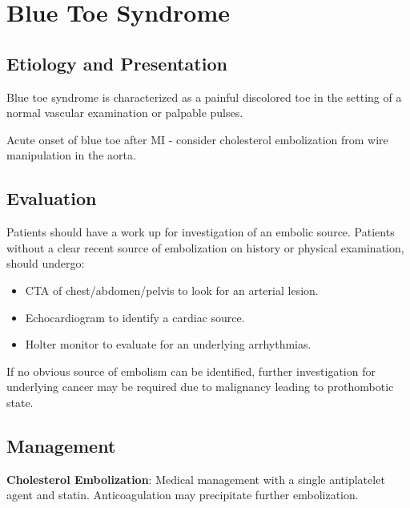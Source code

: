 \documentclass[
]{book}
\begin{document}
\hypertarget{blue-toe-syndrome}{%
\section{Blue Toe Syndrome}\label{blue-toe-syndrome}}

\hypertarget{etiology-and-presentation-1}{%
\subsection{Etiology and Presentation}\label{etiology-and-presentation-1}}

Blue toe syndrome is characterized as a painful discolored toe in the
setting of a normal vascular examination or palpable pulses.

Acute onset of blue toe after MI - consider cholesterol embolization
from wire manipulation in the aorta.
\citep{saricAorticAtherosclerosisEmbolic2012}

\hypertarget{evaluation-13}{%
\subsection{Evaluation}\label{evaluation-13}}

Patients should have a work up for investigation of an embolic source.
Patients without a clear recent source of embolization on history or
physical examination, should undergo:

\begin{itemize}
\item
  CTA of chest/abdomen/pelvis to look for an arterial lesion.
\item
  Echocardiogram to identify a cardiac source.
\item
  Holter monitor to evaluate for an underlying arrhythmias.
\end{itemize}

If no obvious source of embolism can be identified, further investigation
for underlying cancer may be required due to malignancy leading to
prothombotic state.

\hypertarget{management-20}{%
\subsection{Management}\label{management-20}}

\textbf{Cholesterol Embolization}: Medical management with a single
antiplatelet agent and statin. Anticoagulation may precipitate further
embolization. \citep{ghahramaniPostproceduralBlueToes2016, quinonesCholesterolEmboliSyndrome2013}
\end{document}
